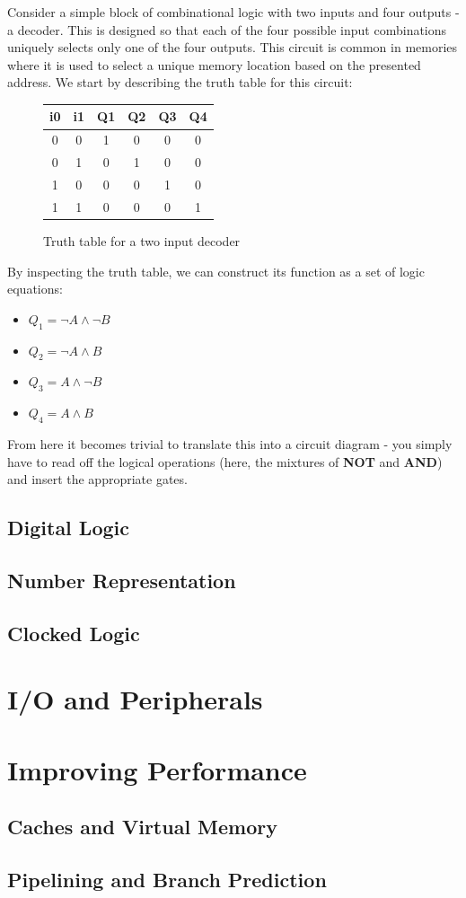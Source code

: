 \documentclass{article}
\begin{document}
	\par 
	Consider a simple block of combinational logic with two inputs and four outputs - a decoder. This is designed so that each of the four possible input combinations uniquely selects only one of the four outputs. This circuit is common in memories where it is used to select a unique memory location based on the presented address. We start by describing the truth table for this circuit:
	\begin{figure}[ht]
		\centering
		\begin{tabular}{c c | c c c c}
		i0 & i1 & Q1 & Q2 & Q3 & Q4  \\ \hline
		0 & 0 & 1 & 0 & 0 & 0 \\
		0 & 1 & 0 & 1 & 0 & 0 \\
		1 & 0 & 0 & 0 & 1 & 0 \\
		1 & 1 & 0 & 0 & 0 & 1
		\end{tabular}
		\caption{Truth table for a two input decoder}
		\label{fig:truth table two input decoder}
	\end{figure}
	
	By inspecting the truth table, we can construct its function as a set of logic equations:
	\begin{itemize}
		\item $Q_{1} = \neg A \wedge \neg B$
		\item $Q_{2} = \neg A \wedge B$
		\item $Q_{3} = A \wedge \neg B$
		\item $Q_{4} = A \wedge B$
	\end{itemize}
	
	From here it becomes trivial to translate this into a circuit diagram - you simply have to read off the logical operations (here, the mixtures of \textbf{NOT} and \textbf{AND}) and insert the appropriate gates.
	
	\begin{circuitikz}
	
	\end{circuitikz}
	
	\subsection{Digital Logic}
	\subsection{Number Representation}
	\subsection{Clocked Logic}
	
	\section{I/O and Peripherals}
	
	\section{Improving Performance}
	\subsection{Caches and Virtual Memory}
	\subsection{Pipelining and Branch Prediction}
	
	\newpage
	\listoffigures
	\printindex	
\end{document}
